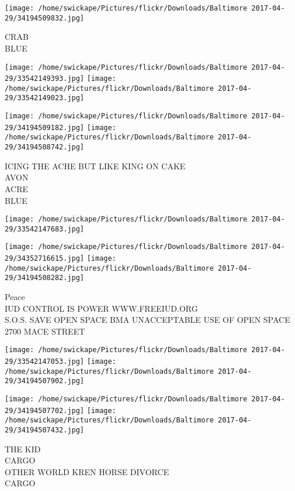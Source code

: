 \documentclass[10pt,letterpaper]{article}
\begin{document}
\vspace{0.25in}
\texttt{[image: /home/swickape/Pictures/flickr/Downloads/Baltimore 2017-04-29/34194509832.jpg]}

CRAB\\
BLUE\\
\pagebreak

\texttt{[image: /home/swickape/Pictures/flickr/Downloads/Baltimore 2017-04-29/33542149393.jpg]}
\texttt{[image: /home/swickape/Pictures/flickr/Downloads/Baltimore 2017-04-29/33542149023.jpg]}

\texttt{[image: /home/swickape/Pictures/flickr/Downloads/Baltimore 2017-04-29/34194509182.jpg]}
\texttt{[image: /home/swickape/Pictures/flickr/Downloads/Baltimore 2017-04-29/34194508742.jpg]}

ICING THE ACHE BUT LIKE KING ON CAKE\\
AVON\\
ACRE\\
BLUE\\
\pagebreak

\texttt{[image: /home/swickape/Pictures/flickr/Downloads/Baltimore 2017-04-29/33542147683.jpg]}

\vspace{0.25in}
\texttt{[image: /home/swickape/Pictures/flickr/Downloads/Baltimore 2017-04-29/34352716615.jpg]}
\texttt{[image: /home/swickape/Pictures/flickr/Downloads/Baltimore 2017-04-29/34194508282.jpg]}

Peace\\
IUD CONTROL IS POWER WWW.FREEIUD.ORG\\
S.O.S. SAVE OPEN SPACE BMA UNACCEPTABLE USE OF OPEN SPACE 2700 MACE STREET\\
\pagebreak

\texttt{[image: /home/swickape/Pictures/flickr/Downloads/Baltimore 2017-04-29/33542147053.jpg]}
\texttt{[image: /home/swickape/Pictures/flickr/Downloads/Baltimore 2017-04-29/34194507902.jpg]}

\texttt{[image: /home/swickape/Pictures/flickr/Downloads/Baltimore 2017-04-29/34194507702.jpg]}
\texttt{[image: /home/swickape/Pictures/flickr/Downloads/Baltimore 2017-04-29/34194507432.jpg]}

THE KID\\
CARGO\\
OTHER WORLD KREN HORSE DIVORCE\\
CARGO\\
\pagebreak
\end{document}
